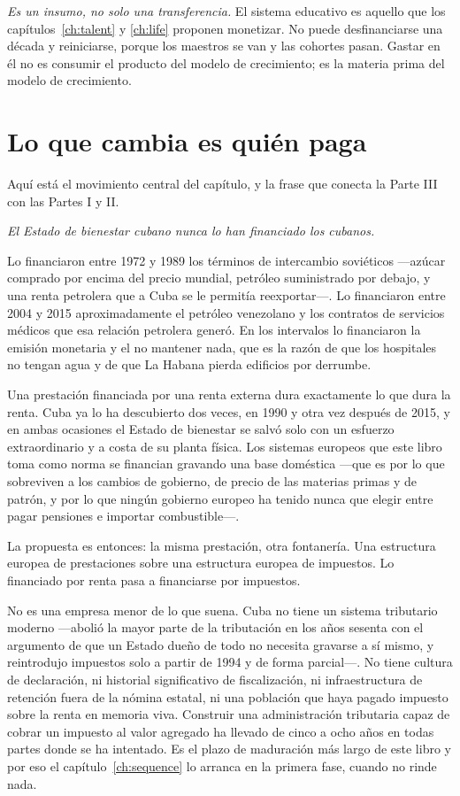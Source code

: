\emph{Es un insumo, no solo una transferencia.} El sistema educativo es aquello que
los capítulos~\ref{ch:talent} y \ref{ch:life} proponen monetizar. No puede
desfinanciarse una década y reiniciarse, porque los maestros se van y las cohortes
pasan. Gastar en él no es consumir el producto del modelo de crecimiento; es la
materia prima del modelo de crecimiento.

\section{Lo que cambia es quién paga}

Aquí está el movimiento central del capítulo, y la frase que conecta la Parte III con
las Partes I y II.

\emph{El Estado de bienestar cubano nunca lo han financiado los cubanos.}

Lo financiaron entre 1972 y 1989 los términos de intercambio soviéticos ---azúcar
comprado por encima del precio mundial, petróleo suministrado por debajo, y una
renta petrolera que a Cuba se le permitía reexportar---. Lo financiaron entre 2004 y
2015 aproximadamente el petróleo venezolano y los contratos de servicios médicos que
esa relación petrolera generó. En los intervalos lo financiaron la emisión monetaria
y el no mantener nada, que es la razón de que los hospitales no tengan agua y de que
La Habana pierda edificios por derrumbe.

Una prestación financiada por una renta externa dura exactamente lo que dura la
renta. Cuba ya lo ha descubierto dos veces, en 1990 y otra vez después de 2015, y en
ambas ocasiones el Estado de bienestar se salvó solo con un esfuerzo extraordinario y
a costa de su planta física. Los sistemas europeos que este libro toma como norma se
financian gravando una base doméstica ---que es por lo que sobreviven a los cambios
de gobierno, de precio de las materias primas y de patrón, y por lo que ningún
gobierno europeo ha tenido nunca que elegir entre pagar pensiones e importar
combustible---.

La propuesta es entonces: la misma prestación, otra fontanería. Una estructura
europea de prestaciones sobre una estructura europea de impuestos. Lo financiado por
renta pasa a financiarse por impuestos.

No es una empresa menor de lo que suena. Cuba no tiene un sistema tributario moderno
---abolió la mayor parte de la tributación en los años sesenta con el argumento de
que un Estado dueño de todo no necesita gravarse a sí mismo, y reintrodujo impuestos
solo a partir de 1994 y de forma parcial---. No tiene cultura de declaración, ni
historial significativo de fiscalización, ni infraestructura de retención fuera de la
nómina estatal, ni una población que haya pagado impuesto sobre la renta en memoria
viva. Construir una administración tributaria capaz de cobrar un impuesto al valor
agregado ha llevado de cinco a ocho años en todas partes donde se ha intentado. Es el
plazo de maduración más largo de este libro y por eso el
capítulo~\ref{ch:sequence} lo arranca en la primera fase, cuando no rinde nada.

